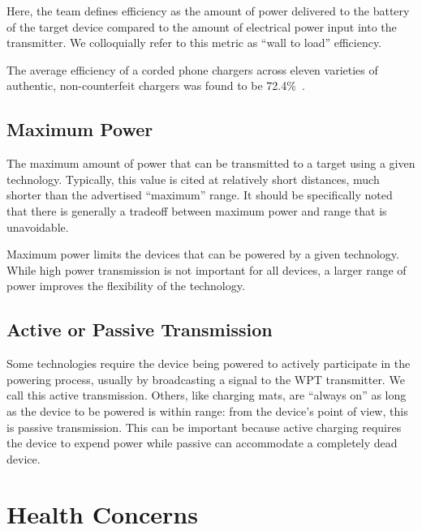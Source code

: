 Here, the team defines efficiency as the amount of power delivered to the battery of the target device compared to the amount of electrical power input into the transmitter. We colloquially refer to this metric as ``wall to load'' efficiency.

The average efficiency of a corded phone chargers across eleven varieties of authentic, non-counterfeit chargers was found to be 72.4\%~\cite{sherriff2012}.

\subsection{Maximum Power}

The maximum amount of power that can be transmitted to a target using a given technology. Typically, this value is cited at relatively short distances, much shorter than the advertised ``maximum'' range. It should be specifically noted that there is generally a tradeoff between maximum power and range that is unavoidable.

Maximum power limits the devices that can be powered by a given technology. While high power transmission is not important for all devices, a larger range of power improves the flexibility of the technology.

\subsection{Active or Passive Transmission}

Some technologies require the device being powered to actively participate in the powering process, usually by broadcasting a signal to the WPT transmitter. We call this active transmission. Others, like charging mats, are ``always on'' as long as the device to be powered is within range: from the device's point of view, this is passive transmission. This can be important because active charging requires the device to expend power while passive can accommodate a completely dead device.

\section{Health Concerns}

